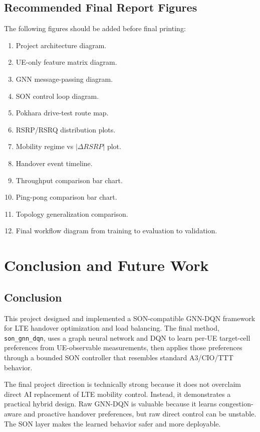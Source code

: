 \documentclass[12pt,a4paper]{report}
\newcommand{\method}{\texttt{son\_gnn\_dqn}}
\begin{document}
\section{Recommended Final Report Figures}
The following figures should be added before final printing:

\begin{enumerate}
    \item Project architecture diagram.
    \item UE-only feature matrix diagram.
    \item GNN message-passing diagram.
    \item SON control loop diagram.
    \item Pokhara drive-test route map.
    \item RSRP/RSRQ distribution plots.
    \item Mobility regime vs $|\Delta RSRP|$ plot.
    \item Handover event timeline.
    \item Throughput comparison bar chart.
    \item Ping-pong comparison bar chart.
    \item Topology generalization comparison.
    \item Final workflow diagram from training to evaluation to validation.
\end{enumerate}

\chapter{Conclusion and Future Work}

\section{Conclusion}
This project designed and implemented a SON-compatible GNN-DQN framework for LTE handover optimization and load balancing. The final method, \method, uses a graph neural network and DQN to learn per-UE target-cell preferences from UE-observable measurements, then applies those preferences through a bounded SON controller that resembles standard A3/CIO/TTT behavior.

The final project direction is technically strong because it does not overclaim direct AI replacement of LTE mobility control. Instead, it demonstrates a practical hybrid design. Raw GNN-DQN is valuable because it learns congestion-aware and proactive handover preferences, but raw direct control can be unstable. The SON layer makes the learned behavior safer and more deployable.
\end{document}
